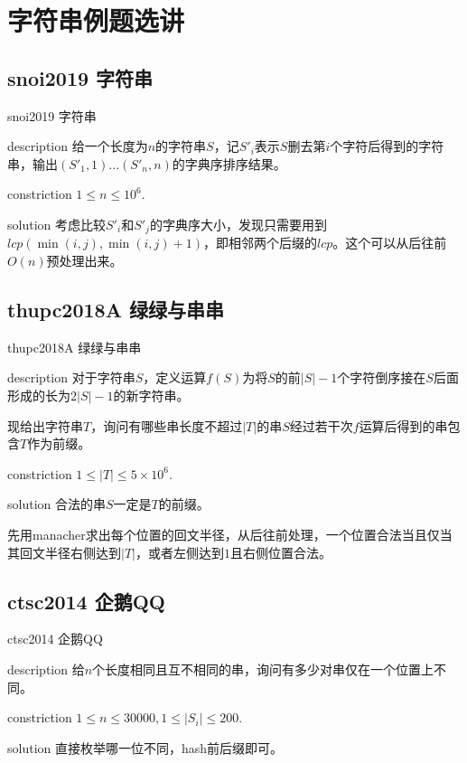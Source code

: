 \documentclass{beamer}
\begin{document}
	\section{字符串例题选讲}
	\subsection{snoi2019 字符串}
	\begin{frame}{snoi2019 字符串}
		\begin{block}{description}
			给一个长度为$n$的字符串$S$，记$S'_i$表示$S$删去第$i$个字符后得到的字符串，输出$(S'_1,1)...(S'_n,n)$的字典序排序结果。
		\end{block}
		\begin{block}{constriction}
			$1 \le n \le 10^6.$
		\end{block}
		\pause
		\begin{block}{solution}
			考虑比较$S'_i$和$S'_j$的字典序大小，发现只需要用到$lcp(\min(i,j),\min(i,j)+1)$，即相邻两个后缀的$lcp$。这个可以从后往前$O(n)$预处理出来。
		\end{block}
	\end{frame}
	\subsection{thupc2018A 绿绿与串串}
	\begin{frame}{thupc2018A 绿绿与串串}
		\begin{block}{description}
			对于字符串$S$，定义运算$f(S)$为将$S$的前$|S|-1$个字符倒序接在$S$后面形成的长为$2|S|-1$的新字符串。
			
			现给出字符串$T$，询问有哪些串长度不超过$|T|$的串$S$经过若干次$f$运算后得到的串包含$T$作为前缀。
		\end{block}
		\begin{block}{constriction}
			$1 \le |T| \le 5 \times 10^6.$
		\end{block}
		\pause
		\begin{block}{solution}
			合法的串$S$一定是$T$的前缀。
			
			先用manacher求出每个位置的回文半径，从后往前处理，一个位置合法当且仅当其回文半径右侧达到$|T|$，或者左侧达到$1$且右侧位置合法。
		\end{block}
	\end{frame}
	\subsection{ctsc2014 企鹅QQ}
	\begin{frame}{ctsc2014 企鹅QQ}
		\begin{block}{description}
			给$n$个长度相同且互不相同的串，询问有多少对串仅在一个位置上不同。
		\end{block}
		\begin{block}{constriction}
			$1 \le n \le 30000, 1 \le |S_i| \le 200.$
		\end{block}
		\pause
		\begin{block}{solution}
			直接枚举哪一位不同，hash前后缀即可。
		\end{block}
	\end{frame}
\end{document}
